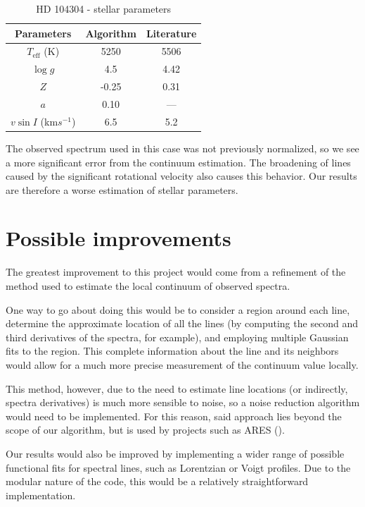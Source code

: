 \documentclass{aa}
\begin{document}
\begin{table}
  \label{tab:star2_params}
  \centering
  \begin{tabular}{c  c  c}
    Parameters & Algorithm & Literature \\
    \midrule
    $T_\text{eff}$ (K) & 5250 & 5506 \\
    $\log g$  & 4.5 & 4.42 \\
    $Z$ & -0.25 & 0.31 \\
    $a$ & 0.10 &  --- \\
    $v \sin I$ (km$s^{-1}$) & 6.5 & 5.2
  \end{tabular}
  \caption{HD 104304 - stellar parameters}
\end{table}

The observed spectrum used in this case was not previously normalized, so we see
a more significant error from the continuum estimation. The broadening of lines
caused by the significant rotational velocity also causes this behavior. Our
results are therefore a worse estimation of stellar parameters.

\section{Possible improvements}
\label{sec:improvements}

The greatest improvement to this project would come from a refinement of the
method used to estimate the local continuum of observed spectra.

One way to go about doing this would be to consider a region around each line,
determine the approximate location of all the lines (by computing the second and
third derivatives of the spectra, for example), and employing multiple Gaussian
fits to the region. This complete information about the line and its neighbors
would allow for a much more precise measurement of the continuum value locally.

This method, however, due to the need to estimate line locations (or indirectly,
spectra derivatives) is much more sensible to noise, so a noise reduction
algorithm would need to be implemented. For this reason, said approach lies
beyond the scope of our algorithm, but is used by projects such as ARES (\cite{sousa_ares_2015}).

Our results would also be improved by implementing a wider range of possible
functional fits for spectral lines, such as Lorentzian or Voigt profiles. Due to
the modular nature of the code, this would be a relatively straightforward implementation.
\end{document}
